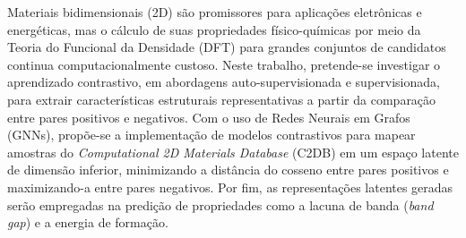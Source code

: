 \documentclass[	12pt, Times, openright, twoside, a4paper, english, brazil]{abntex2}
\begin{document}
\begin{resumo}
Materiais bidimensionais (2D) são promissores para aplicações eletrônicas e energéticas, mas o cálculo de suas propriedades físico-químicas por meio da Teoria do Funcional da Densidade (DFT) para grandes conjuntos de candidatos continua computacionalmente custoso. Neste trabalho, pretende-se investigar o aprendizado contrastivo, em abordagens auto-supervisionada e supervisionada, para extrair características estruturais representativas a partir da comparação entre pares positivos e negativos. Com o uso de Redes Neurais em Grafos (GNNs), propõe-se a implementação de modelos contrastivos para mapear amostras do \textit{Computational 2D Materials Database} (C2DB) em um espaço latente de dimensão inferior, minimizando a distância do cosseno entre pares positivos e maximizando-a entre pares negativos. Por fim, as representações latentes geradas serão empregadas na predição de propriedades como a lacuna de banda (\textit{band gap}) e a energia de formação. 

 

\end{resumo}
\end{document}
